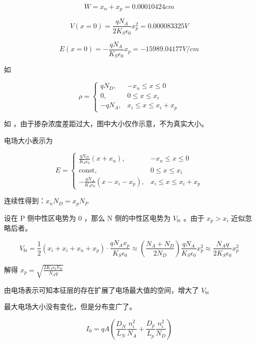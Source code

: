 \documentclass[lang=cn,11pt,a4paper,cite=authoryear]{elegantpaper}
\begin{document}
\[W = x_n + x_p = 0.00010424 cm\]


\[V(x=0) = \frac{q N_A }{2 K_S \epsilon_0} x_p^2 = 0.000083325 V\]

\[E(x=0) = - \frac{qN_A}{K_S \epsilon_0}x_p = -15989.04177 V/cm\]


如 




\[\rho = \left\{
\begin{aligned}
    q N_D , & -x_n \leq x \leq 0\\
    0, & 0 \leq x \leq x_i\\ 
    -q N_A, & x_i \leq x \leq x_i + x_p 
\end{aligned}    
\right.\]

如 ，由于掺杂浓度差距过大，图中大小仅作示意，不为真实大小。


电场大小表示为 

\[
E = \left\{
\begin{aligned}
    \frac{q N_D}{K_S \epsilon_0} (x+x_n), & -x_n \leq x \leq 0 \\
    \text{const}, & 0 \leq x \leq x_i \\ 
    -\frac{q N_A}{K_S \epsilon_0} (x - x_i - x_p), & x_i \leq x \leq x_i + x_p
\end{aligned}    
\right.    
\]

连续性得到：\(x_n N_D = x_p N_P\) 

设在 P 侧中性区电势为 \(0\) ，那么 N 侧的中性区电势为 \(V_{bi}\) 。由于 \(x_p > x_i\) 近似忽略后者。

\[V_{bi} = \frac{1}{2} (x_i + x_i + x_n + x_p) \cdot \frac{q N_A x_p}{K_S \epsilon_0} \approx (\frac{N_A + N_D}{2 N_D}) \frac{q N_A}{K_S \epsilon_0} x_p^2 \approx \frac{N_A q}{2 K_S \epsilon_0} x_p^2 \]

解得 \(x_p = \sqrt{\frac{2 K_S \epsilon_0 V_{bi}}{N_A q}}\)


由电场表示可知本征层的存在扩展了电场最大值的空间，增大了 \(V_{bi}\)


最大电场大小没有变化，但是分布变广了。


\[I_0 = q A (\frac{D_N}{L_N} \frac{n_i^2}{N_A} + \frac{D_p}{L_p}\frac{n_i^2}{N_D})\]
\end{document}
